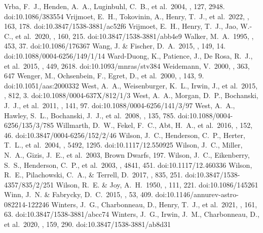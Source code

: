 \documentclass[twocolumn,tighten,twocolappendix]{aastex631}
\begin{document}
\begin{thebibliography}{}
 Vrba, F.~J., Henden, A.~A., Luginbuhl, C.~B., et al.\ 2004, \aj, 127, 2948. doi:10.1086/383554
 Vrijmoet, E.~H., Tokovinin, A., Henry, T.~J., et al.\ 2022, \aj, 163, 178. doi:10.3847/1538-3881/ac52f6
 Vrijmoet, E.~H., Henry, T.~J., Jao, W.-C., et al.\ 2020, \aj, 160, 215. doi:10.3847/1538-3881/abb4e9
 Walker, M.~A.\ 1995, \apj, 453, 37. doi:10.1086/176367
 Wang, J. \& Fischer, D.~A.\ 2015, \aj, 149, 14. doi:10.1088/0004-6256/149/1/14
 Ward-Duong, K., Patience, J., De Rosa, R.~J., et al.\ 2015, \mnras, 449, 2618. doi:10.1093/mnras/stv384
 Weidemann, V.\ 2000, \aap, 363, 647
 Wenger, M., Ochsenbein, F., Egret, D., et al.\ 2000, \aaps, 143, 9. doi:10.1051/aas:2000332
 West, A.~A., Weisenburger, K.~L., Irwin, J., et al.\ 2015, \apj, 812, 3. doi:10.1088/0004-637X/812/1/3
 West, A.~A., Morgan, D.~P., Bochanski, J.~J., et al.\ 2011, \aj, 141, 97. doi:10.1088/0004-6256/141/3/97
 West, A.~A., Hawley, S.~L., Bochanski, J.~J., et al.\ 2008, \aj, 135, 785. doi:10.1088/0004-6256/135/3/785
 Willmarth, D.~W., Fekel, F.~C., Abt, H.~A., et al.\ 2016, \aj, 152, 46. doi:10.3847/0004-6256/152/2/46
 Wilson, J.~C., Henderson, C.~P., Herter, T.~L., et al.\ 2004, \procspie, 5492, 1295. doi:10.1117/12.550925
 Wilson, J.~C., Miller, N.~A., Gizis, J.~E., et al.\ 2003, Brown Dwarfs, 197.
 Wilson, J.~C., Eikenberry, S.~S., Henderson, C.~P., et al.\ 2003, \procspie, 4841, 451. doi:10.1117/12.460336
 Wilson, R.~E., Pilachowski, C.~A., \& Terrell, D.\ 2017, \apj, 835, 251. doi:10.3847/1538-4357/835/2/251
 Wilson, R.~E. \& Joy, A.~H.\ 1950, \apj, 111, 221. doi:10.1086/145261
 Winn, J.~N. \& Fabrycky, D.~C.\ 2015, \araa, 53, 409. doi:10.1146/annurev-astro-082214-122246
 Winters, J.~G., Charbonneau, D., Henry, T.~J., et al.\ 2021, \aj, 161, 63. doi:10.3847/1538-3881/abcc74
 Winters, J.~G., Irwin, J.~M., Charbonneau, D., et al.\ 2020, \aj, 159, 290. doi:10.3847/1538-3881/ab8d31

\end{thebibliography}
\end{document}
